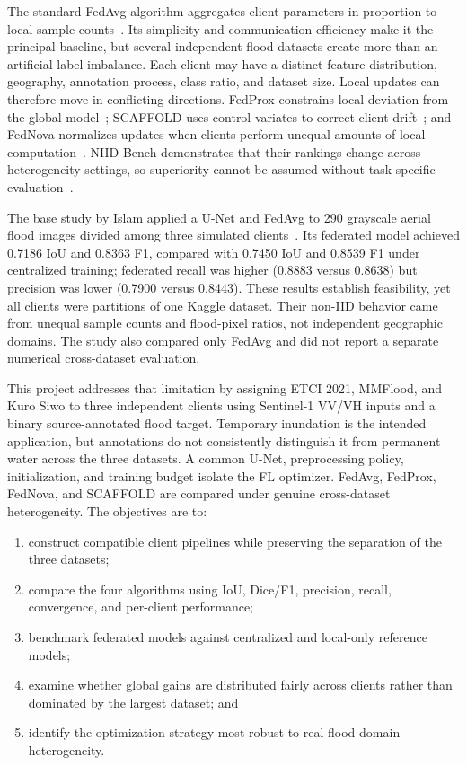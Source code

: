 \documentclass[conference]{IEEEtran}
\begin{document}
The standard FedAvg algorithm aggregates client parameters in proportion to local sample counts~\cite{mcmahan2017communication}. Its simplicity and communication efficiency make it the principal baseline, but several independent flood datasets create more than an artificial label imbalance. Each client may have a distinct feature distribution, geography, annotation process, class ratio, and dataset size. Local updates can therefore move in conflicting directions. FedProx constrains local deviation from the global model~\cite{li2020federated}; SCAFFOLD uses control variates to correct client drift~\cite{karimireddy2020scaffold}; and FedNova normalizes updates when clients perform unequal amounts of local computation~\cite{wang2020tackling}. NIID-Bench demonstrates that their rankings change across heterogeneity settings, so superiority cannot be assumed without task-specific evaluation~\cite{li2022federated}.

The base study by Islam applied a U-Net and FedAvg to 290 grayscale aerial flood images divided among three simulated clients~\cite{islam2025robust}. Its federated model achieved 0.7186 IoU and 0.8363 F1, compared with 0.7450 IoU and 0.8539 F1 under centralized training; federated recall was higher (0.8883 versus 0.8638) but precision was lower (0.7900 versus 0.8443). These results establish feasibility, yet all clients were partitions of one Kaggle dataset. Their non-IID behavior came from unequal sample counts and flood-pixel ratios, not independent geographic domains. The study also compared only FedAvg and did not report a separate numerical cross-dataset evaluation.

This project addresses that limitation by assigning ETCI 2021, MMFlood, and Kuro Siwo to three independent clients using Sentinel-1 VV/VH inputs and a binary source-annotated flood target. Temporary inundation is the intended application, but annotations do not consistently distinguish it from permanent water across the three datasets. A common U-Net, preprocessing policy, initialization, and training budget isolate the FL optimizer. FedAvg, FedProx, FedNova, and SCAFFOLD are compared under genuine cross-dataset heterogeneity. The objectives are to:
\begin{enumerate}
    \item construct compatible client pipelines while preserving the separation of the three datasets;
    \item compare the four algorithms using IoU, Dice/F1, precision, recall, convergence, and per-client performance;
    \item benchmark federated models against centralized and local-only reference models;
    \item examine whether global gains are distributed fairly across clients rather than dominated by the largest dataset; and
    \item identify the optimization strategy most robust to real flood-domain heterogeneity.
\end{enumerate}
\end{document}
